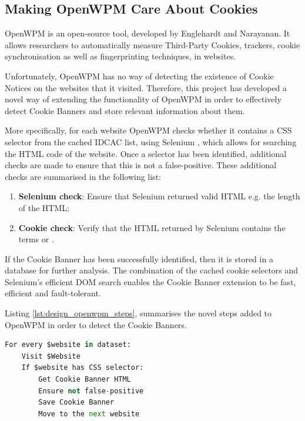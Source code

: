 \documentclass[../main.tex]{subfiles}
\begin{document}
\subsection{Making OpenWPM Care About Cookies}
OpenWPM is an open-source tool, developed by Englehardt and Narayanan. It allows researchers to automatically measure Third-Party Cookies, trackers, cookie synchronisation as well as fingerprinting techniques, in websites.

Unfortunately, OpenWPM has no way of detecting the existence of Cookie Notices on the websites that it visited. Therefore, this project has developed a novel way of extending the functionality of OpenWPM in order to effectively detect Cookie Banners and store relevant information about them. 

More specifically, for each website OpenWPM checks whether it contains a CSS selector from the cached IDCAC list, using Selenium \cite{selenium}, which allows for searching the HTML code of the website. Once a selector has been identified, additional checks are made to ensure that this is not a false-positive. These additional checks are summarised in the following list: 

\begin{enumerate}
    \item \textbf{Selenium check}: Ensure that Selenium returned valid HTML e.g. the length of the HTML;
    \item \textbf{Cookie check}: Verify that the HTML returned by Selenium contains the terms  or .
\end{enumerate}

If the Cookie Banner has been successfully identified, then it is stored in a database for further analysis. The combination of the cached cookie selectors and Selenium’s efficient DOM \cite{wood1998document} search enables the Cookie Banner extension to be fast, efficient and fault-tolerant. 

Listing \ref{lst:design_openwpm_steps}, summarises the novel steps added to OpenWPM in order to detect the Cookie Banners.

\begin{lstlisting}[language=Python, caption=Pseudocode of the steps that the OpenWPM extension uses., label=lst:design_openwpm_steps,captionpos=b, style=lst_style]
For every $website in dataset:
    Visit $Website
    If $website has CSS selector:
        Get Cookie Banner HTML
        Ensure not false-positive
        Save Cookie Banner
        Move to the next website
\end{lstlisting}
\end{document}
